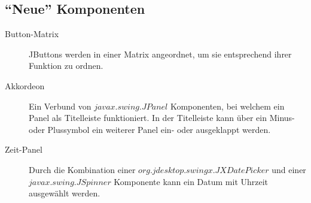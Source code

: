   \subsection{``Neue'' Komponenten}
  
  \begin{description}
    \item[Button-Matrix]
    JButtons werden in einer Matrix angeordnet, um sie entsprechend ihrer
    Funktion zu ordnen.
    \item[Akkordeon]
    Ein Verbund von \(javax.swing.JPanel\) Komponenten, bei welchem ein
    Panel als Titelleiste funktioniert. In der Titelleiste kann über ein Minus-
    oder Plussymbol ein weiterer Panel ein- oder ausgeklappt werden.
    \item[Zeit-Panel]
    Durch die Kombination einer \(org.jdesktop.swingx.JXDatePicker\) und einer
    \(javax.swing.JSpinner\) Komponente kann ein Datum mit Uhrzeit ausgewählt
    werden.
  \end{description}